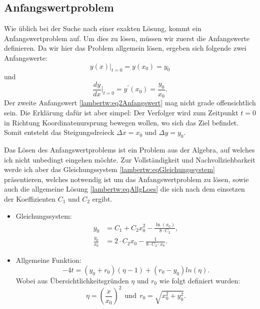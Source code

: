 \subsection{Anfangswertproblem 
	\label{lambertw:subsection:AllgLoes}}
Wie üblich bei der Suche nach einer exakten Lösung, kommt ein Anfangswertproblem auf. Um dies zu lösen, müssen wir zuerst die Anfangswerte definieren. Da wir hier das Problem allgemein lösen, ergeben sich folgende zwei Anfangswerte:
\begin{equation}
	y(x)\big \vert_{t=0}
	=
	y(x_0)
	= 
	y_0
	\label{lambertw:eq1Anfangswert}
\end{equation}
und
\begin{equation}
	\frac{dy}{dx}\bigg \vert_{t=0}
	=
	y^{\prime}(x_0)
	=
	\frac{y_0}{x_0}.
	\label{lambertw:eq2Anfangswert}
\end{equation}
Der zweite Anfangswert \eqref{lambertw:eq2Anfangswert} mag nicht grade offensichtlich sein. Die Erklärung dafür ist aber simpel: Der Verfolger wird zum Zeitpunkt \(t=0\) in Richtung Koordinatenursprung bewegen wollen, wo sich das Ziel befindet. Somit entsteht das Steigungsdreieck \(\Delta x = x_0\) und \(\Delta y = y_0\).

Das Lösen des Anfangswertproblems ist ein Problem aus der Algebra, auf welches ich nicht unbedingt eingehen möchte. Zur Vollständigkeit und Nachvollziehbarkeit werde ich aber das Gleichungssystem \eqref{lambertw:eqGleichungssystem} präsentieren, welches notwendig ist um das Anfangswertproblem zu lösen, sowie auch die allgemeine Lösung \eqref{lambertw:eqAllgLoes} die sich nach dem einsetzen der Koeffizienten \(C_1\) und \(C_2\) ergibt.

\begin{itemize}
	\item
	Gleichungssystem:
	\begin{subequations}
		\begin{align}
			y_0
			&=
			C_1 + C_2 x^2_0 - \frac{\operatorname{ln}(x_0)}{8 \cdot C_2}, \\
			\frac{y_0}{x_0}
			&=
			2 \cdot  C_2 x_0 - \frac{1}{8 \cdot C_2 \cdot x_0}.
		\end{align}
		\label{lambertw:eqGleichungssystem}
	\end{subequations}
	\item
	Allgemeine Funktion:
	\begin{equation}
		-4t
		=
		\left(y_0+r_0\right)\left(\eta-1\right)+\left(r_0-y_0\right)ln\left(\eta\right).
		\label{lambertw:eqAllgLoes}
	\end{equation}
	Wobei aus Übersichtlichkeitsgründen \(\eta\) und \(r_0\) wie folgt definiert wurden:
	\begin{equation}
		\eta
		=
		\left(\frac{x}{x_0}\right)^2 
		\:\:\text{und}\:\:
		r_0
		=
		\sqrt{x_0^2+y_0^2}.
	\end{equation}
\end{itemize}



